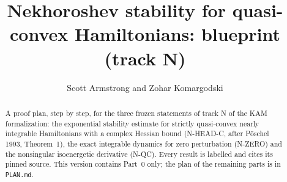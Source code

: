 \documentclass[11pt]{amsart}
\title{Nekhoroshev stability for quasi-convex Hamiltonians: blueprint (track N)}
\author{Scott Armstrong and Zohar Komargodski}
\begin{document}
\begin{abstract}
A proof plan, step by step, for the three frozen statements of track N of the KAM formalization:
the exponential stability estimate for strictly quasi-convex nearly integrable Hamiltonians with a
complex Hessian bound (N-HEAD-C, after P\"oschel 1993, Theorem~1), the exact integrable dynamics for
zero perturbation (N-ZERO) and the nonsingular isoenergetic derivative (N-QC). Every result is
labelled and cites its pinned source. This version contains Part~0 only; the plan of the remaining
parts is in \texttt{PLAN.md}.
\end{abstract}
\maketitle
\tableofcontents















\end{document}
